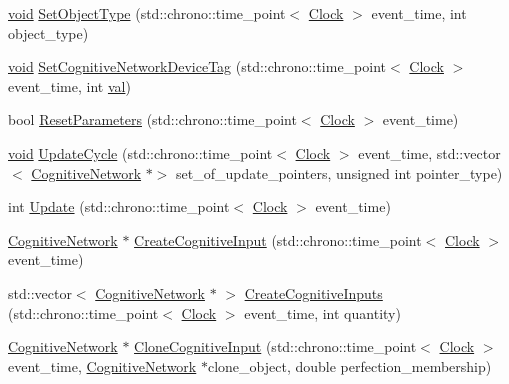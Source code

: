 \begin{DoxyCompactItemize}
\mbox{\hyperlink{glad_8h_a950fc91edb4504f62f1c577bf4727c29}{void}} \mbox{\hyperlink{class_cognitive_network_ad95a0b25c7f61fc52322938eb13c9e3e}{Set\+Object\+Type}} (std\+::chrono\+::time\+\_\+point$<$ \mbox{\hyperlink{universe_8h_a0ef8d951d1ca5ab3cfaf7ab4c7a6fd80}{Clock}} $>$ event\+\_\+time, int object\+\_\+type)
\item 
\mbox{\hyperlink{glad_8h_a950fc91edb4504f62f1c577bf4727c29}{void}} \mbox{\hyperlink{class_cognitive_network_a0e8a64151a2446fc16a074ad2de325df}{Set\+Cognitive\+Network\+Device\+Tag}} (std\+::chrono\+::time\+\_\+point$<$ \mbox{\hyperlink{universe_8h_a0ef8d951d1ca5ab3cfaf7ab4c7a6fd80}{Clock}} $>$ event\+\_\+time, int \mbox{\hyperlink{glad_8h_a26942fd2ed566ef553eae82d2c109c8f}{val}})
\item 
bool \mbox{\hyperlink{class_cognitive_network_a8af8ed2605263e57a32e457aba2af99d}{Reset\+Parameters}} (std\+::chrono\+::time\+\_\+point$<$ \mbox{\hyperlink{universe_8h_a0ef8d951d1ca5ab3cfaf7ab4c7a6fd80}{Clock}} $>$ event\+\_\+time)
\item 
\mbox{\hyperlink{glad_8h_a950fc91edb4504f62f1c577bf4727c29}{void}} \mbox{\hyperlink{class_cognitive_network_aa37dda869174e4eef986cca4ce3e55d2}{Update\+Cycle}} (std\+::chrono\+::time\+\_\+point$<$ \mbox{\hyperlink{universe_8h_a0ef8d951d1ca5ab3cfaf7ab4c7a6fd80}{Clock}} $>$ event\+\_\+time, std\+::vector$<$ \mbox{\hyperlink{class_cognitive_network}{Cognitive\+Network}} $\ast$$>$ set\+\_\+of\+\_\+update\+\_\+pointers, unsigned int pointer\+\_\+type)
\item 
int \mbox{\hyperlink{class_cognitive_network_a05dccc7759456df13a732899a8f1f4c4}{Update}} (std\+::chrono\+::time\+\_\+point$<$ \mbox{\hyperlink{universe_8h_a0ef8d951d1ca5ab3cfaf7ab4c7a6fd80}{Clock}} $>$ event\+\_\+time)
\item 
\mbox{\hyperlink{class_cognitive_network}{Cognitive\+Network}} $\ast$ \mbox{\hyperlink{class_cognitive_network_add96197c3dc51d94d06edb480fbc4a38}{Create\+Cognitive\+Input}} (std\+::chrono\+::time\+\_\+point$<$ \mbox{\hyperlink{universe_8h_a0ef8d951d1ca5ab3cfaf7ab4c7a6fd80}{Clock}} $>$ event\+\_\+time)
\item 
std\+::vector$<$ \mbox{\hyperlink{class_cognitive_network}{Cognitive\+Network}} $\ast$ $>$ \mbox{\hyperlink{class_cognitive_network_a0833f7b587f14e0c0778661a56bce957}{Create\+Cognitive\+Inputs}} (std\+::chrono\+::time\+\_\+point$<$ \mbox{\hyperlink{universe_8h_a0ef8d951d1ca5ab3cfaf7ab4c7a6fd80}{Clock}} $>$ event\+\_\+time, int quantity)
\item 
\mbox{\hyperlink{class_cognitive_network}{Cognitive\+Network}} $\ast$ \mbox{\hyperlink{class_cognitive_network_a058cb2b044d56268e36f153fac21084e}{Clone\+Cognitive\+Input}} (std\+::chrono\+::time\+\_\+point$<$ \mbox{\hyperlink{universe_8h_a0ef8d951d1ca5ab3cfaf7ab4c7a6fd80}{Clock}} $>$ event\+\_\+time, \mbox{\hyperlink{class_cognitive_network}{Cognitive\+Network}} $\ast$clone\+\_\+object, double perfection\+\_\+membership)
$$
\end{DoxyCompactItemize}
